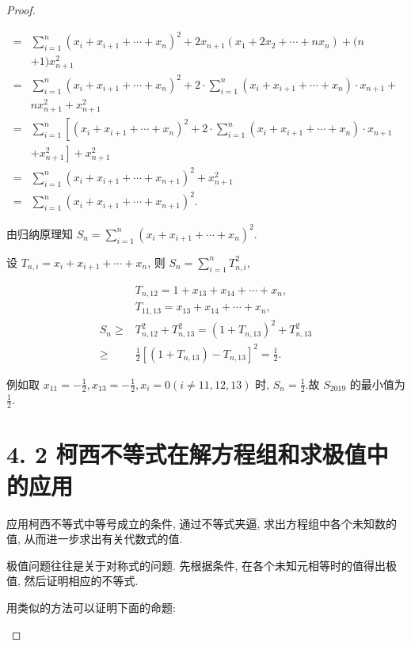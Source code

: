 \begin{proof}
\begin{example}
\begin{solution}
	$$
	\begin{aligned}
	= & \sum_{i=1}^{n}\left(x_{i}+x_{i+1}+\cdots+x_{n}\right)^{2}+2 x_{n+1}\left(x_{1}+2 x_{2}+\cdots+n x_{n}\right)+(n \\
	& +1) x_{n+1}^{2} \\
	= & \sum_{i=1}^{n}\left(x_{i}+x_{i+1}+\cdots+x_{n}\right)^{2}+2 \cdot \sum_{i=1}^{n}\left(x_{i}+x_{i+1}+\cdots+x_{n}\right) \cdot x_{n+1}+ \\
	& n x_{n+1}^{2}+x_{n+1}^{2} \\
	= & \sum_{i=1}^{n}\left[\left(x_{i}+x_{i+1}+\cdots+x_{n}\right)^{2}+2 \cdot \sum_{i=1}^{n}\left(x_{i}+x_{i+1}+\cdots+x_{n}\right) \cdot x_{n+1}\right. \\
	& \left.+x_{n+1}^{2}\right]+x_{n+1}^{2} \\
	= & \sum_{i=1}^{n}\left(x_{i}+x_{i+1}+\cdots+x_{n+1}\right)^{2}+x_{n+1}^{2} \\
	= & \sum_{i=1}^{n}\left(x_{i}+x_{i+1}+\cdots+x_{n+1}\right)^{2} .
	\end{aligned}
	$$
	
	由归纳原理知 $S_{n}=\sum_{i=1}^{n}\left(x_{i}+x_{i+1}+\cdots+x_{n}\right)^{2}$.
	
	设 $T_{n, i}=x_{i}+x_{i+1}+\cdots+x_{n}$, 则 $S_{n}=\sum_{i=1}^{n} T_{n, i}^{2}$,
	
	$$
	\begin{aligned}
	& T_{n, 12}=1+x_{13}+x_{14}+\cdots+x_{n}, \\
	& T_{11,13}=x_{13}+x_{14}+\cdots+x_{n}, \\
	S_{n} \geqslant & T_{n, 12}^{2}+T_{n, 13}^{2}=\left(1+T_{n, 13}\right)^{2}+T_{n, 13}^{2} \\
	\geqslant & \frac{1}{2}\left[\left(1+T_{n, 13}\right)-T_{n, 13}\right]^{2}=\frac{1}{2} .
	\end{aligned}
	$$
	
	例如取 $x_{11}=-\frac{1}{2}, x_{13}=-\frac{1}{2}, x_{i}=0(i \neq 11,12,13)$ 时, $S_{n}=\frac{1}{2}$.故 $S_{2019}$ 的最小值为 $\frac{1}{2}$.
	
	\section*{4. 2 柯西不等式在解方程组和求极值中的应用}
	应用柯西不等式中等号成立的条件, 通过不等式夹逼, 求出方程组中各个未知数的值, 从而进一步求出有关代数式的值.
	
	极值问题往往是关于对称式的问题. 先根据条件, 在各个未知元相等时的值得出极值, 然后证明相应的不等式.\\
\begin{note}
	用类似的方法可以证明下面的命题:
	

\end{note}
\end{solution}
\end{example}
\end{proof}
